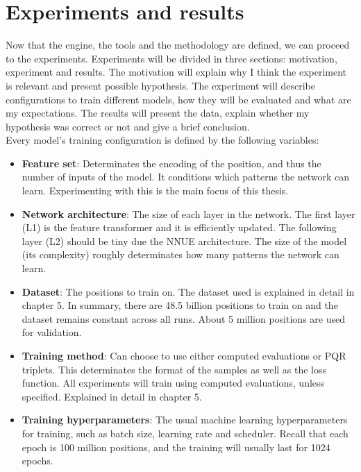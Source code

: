 \section{Experiments and results}

Now that the engine, the tools and the methodology are defined, we can proceed to the experiments. Experiments will be divided in three sections: motivation, experiment and results. The motivation will explain why I think the experiment is relevant and present possible hypothesis. The experiment will describe configurations to train different models, how they will be evaluated and what are my expectations. The results will present the data, explain whether my hypothesis was correct or not and give a brief conclusion. \\

Every model's training configuration is defined by the following variables:

\begin{itemize}
\item \textbf{Feature set}: Determinates the encoding of the position, and thus the number of inputs of the model. It conditions which patterns the network can learn. Experimenting with this is the main focus of this thesis.

\item \textbf{Network architecture}: The size of each layer in the network. The first layer (L1) is the feature transformer and it is efficiently updated. The following layer (L2) should be tiny due the NNUE architecture. The size of the model (its complexity) roughly determinates how many patterns the network can learn.

\item \textbf{Dataset}: The positions to train on. The dataset used is explained in detail in chapter 5. In summary, there are 48.5 billion positions to train on and the dataset remains constant across all runs. About 5 million positions are used for validation.

\item \textbf{Training method}: Can choose to use either computed evaluations or PQR triplets. This determinates the format of the samples as well as the loss function. All experiments will train using computed evaluations, unless specified. Explained in detail in chapter 5.

\item \textbf{Training hyperparameters}: The usual machine learning hyperparameters for training, such as batch size, learning rate and scheduler. Recall that each epoch is 100 million positions, and the training will usually last for 1024 epochs.
\end{itemize}

